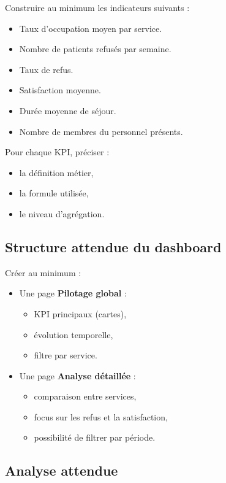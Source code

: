 \documentclass[11pt,a4paper]{article}
\begin{document}
Construire au minimum les indicateurs suivants :

\begin{itemize}
  \item Taux d’occupation moyen par service.
  \item Nombre de patients refusés par semaine.
  \item Taux de refus.
  \item Satisfaction moyenne.
  \item Durée moyenne de séjour.
  \item Nombre de membres du personnel présents.
\end{itemize}

Pour chaque KPI, préciser :

\begin{itemize}
  \item la définition métier,
  \item la formule utilisée,
  \item le niveau d’agrégation.
\end{itemize}

\subsection*{Structure attendue du dashboard}

Créer au minimum :

\begin{itemize}
  \item Une page \textbf{Pilotage global} :
  \begin{itemize}
    \item KPI principaux (cartes),
    \item évolution temporelle,
    \item filtre par service.
  \end{itemize}
  \item Une page \textbf{Analyse détaillée} :
  \begin{itemize}
    \item comparaison entre services,
    \item focus sur les refus et la satisfaction,
    \item possibilité de filtrer par période.
  \end{itemize}
\end{itemize}

\subsection*{Analyse attendue}
\end{document}
